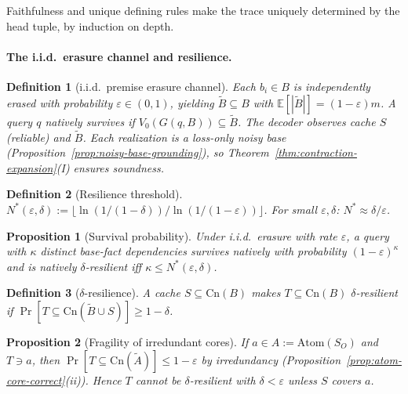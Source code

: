 \documentclass[journal]{IEEEtran}
\makeatletter
\newcommand{\Atom}{\text{Atom}}
\newcommand{\Cn}{\text{Cn}}
\newcommand{\E}{\mathbb{E}}
\newtheorem{proposition}{Proposition}[section]
\newtheorem{definition}{Definition}[section]
\numberwithin{equation}{section}
\renewenvironment{proof}[1][\proofname]{\par
  \pushQED{\qed}%
  \normalfont \topsep6\p@\@plus6\p@\relax
  \trivlist
  \item[\hskip\labelsep
        \itshape
    #1\@addpunct{.}]\ignorespaces
}{%
  \popQED\endtrivlist\@endpefalse
}
\makeatother
\begin{document}
\begin{proof}
Faithfulness and unique defining rules make the trace
uniquely determined by the head tuple, by induction on depth.
\end{proof}

\paragraph{The i.i.d.\ erasure channel and resilience.}

\begin{definition}[i.i.d.\ premise erasure channel]
\label{def:iid-erasure}
Each $b_i\in B$ is independently erased with probability
$\varepsilon\in(0,1)$, yielding $\tilde B\subseteq B$ with
$\E[|\tilde B|]=(1{-}\varepsilon)m$.
A query $q$ \emph{natively survives} if
$V_0(G(q,B))\subseteq\tilde B$.
The decoder observes cache $S$ (reliable) and $\tilde B$.
Each realization is a loss-only noisy base
\textup{(Proposition~\ref{prop:noisy-base-grounding})},
so Theorem~\ref{thm:contraction-expansion}\textup{(I)}
ensures soundness.
\end{definition}

\begin{definition}[Resilience threshold]
\label{def:noise-threshold}
$N^*(\varepsilon,\delta)
 :=\lfloor\ln(1/(1{-}\delta))/\ln(1/(1{-}\varepsilon))\rfloor$.
For small $\varepsilon,\delta$: $N^*\approx\delta/\varepsilon$.
\end{definition}

\begin{proposition}[Survival probability]
\label{prop:survival-prob}
Under i.i.d.\ erasure with rate $\varepsilon$, a query with
$\kappa$ distinct base-fact dependencies survives natively with
probability $(1{-}\varepsilon)^\kappa$ and is natively
$\delta$-resilient iff $\kappa\le N^*(\varepsilon,\delta)$.
\end{proposition}

\begin{definition}[$\delta$-resilience]
\label{def:N-resilience}
A cache $S\subseteq\Cn(B)$ makes $T\subseteq\Cn(B)$
\emph{$\delta$-resilient} if
$\Pr[T\subseteq\Cn(\tilde B\cup S)]\ge 1{-}\delta$.
\end{definition}

\begin{proposition}[Fragility of irredundant cores]
\label{prop:fragility}
If $a\in A:=\Atom(S_O)$ and $T\ni a$, then
$\Pr[T\subseteq\Cn(\tilde A)]\le 1{-}\varepsilon$
by irredundancy
\textup{(Proposition~\ref{prop:atom-core-correct}(ii))}.
Hence $T$ cannot be $\delta$-resilient with
$\delta<\varepsilon$ unless $S$ covers $a$.
\end{proposition}
\end{document}
